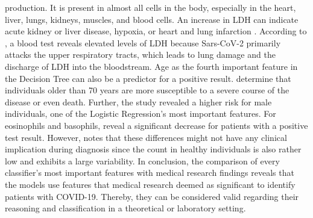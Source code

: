 production. 
It is present in almost all cells in the body, especially in the heart, 
liver, lungs, kidneys, muscles, and blood cells. An increase in LDH can 
indicate acute kidney or liver disease, hypoxia, or heart and lung 
infarction \cite{RN190, RN188}. According to \cite{RN162, RN187}, a blood test 
reveals elevated levels of LDH because Sars-CoV-2 primarily attacks the upper 
respiratory tracts, which leads to lung damage and the discharge of LDH into 
the bloodstream. Age as the fourth important feature in the Decision Tree can 
also be a predictor for a positive result. \citeauthor{RN193} \cite{RN193} 
determine that individuals older than 70 years are more susceptible to a severe 
course of the disease or even death. Further, the study revealed a higher risk 
for male individuals, one of the Logistic Regression's most important features.
For eosinophils and basophils, \cite{RN162, RN185} reveal a significant 
decrease for patients with a positive test result. However, \cite{RN162} notes 
that these differences might not have any clinical implication during diagnosis 
since the count in healthy individuals is also rather low and exhibits a large 
variability.
In conclusion, the comparison of every classifier's most important features 
with medical research findings reveals that the models use 
features that medical research deemed as significant to identify patients with 
COVID-19. Thereby, they can be considered valid regarding their reasoning and 
classification in a theoretical or laboratory setting.
